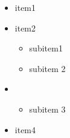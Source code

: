 \documentclass{beamer}
\begin{document}
    \begin{frame}
        \begin{itemize}
            \item item1
            \item item2      
            \begin{itemize}
                \item subitem1
                \item subitem 2
            \end{itemize}
        \end{itemize} 
    \end{frame} 

    \begin{frame}
        \begin{itemize}
            \item[] 
            \begin{itemize}
                \item subitem 3
            \end{itemize}
            \item item4
        \end{itemize} 
    \end{frame} 
\end{document}
